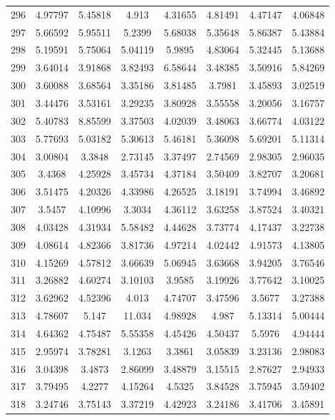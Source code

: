 \begin{center}
\begin{longtable}{cccccccc}
296 & 4.97797 & 5.45818 & 4.913 & 4.31655 & 4.81491 & 4.47147 & 4.06848\\
297 & 5.66592 & 5.95511 & 5.2399 & 5.68038 & 5.35648 & 5.86387 & 5.43884\\
298 & 5.19591 & 5.75064 & 5.04119 & 5.9895 & 4.83064 & 5.32445 & 5.13688\\
299 & 3.64014 & 3.91868 & 3.82493 & 6.58644 & 3.48385 & 3.50916 & 5.84269\\
300 & 3.60088 & 3.68564 & 3.35186 & 3.81485 & 3.7981 & 3.45893 & 3.02519\\
301 & 3.44476 & 3.53161 & 3.29235 & 3.80928 & 3.55558 & 3.20056 & 3.16757\\
302 & 5.40783 & 8.85599 & 3.37503 & 4.02039 & 3.48063 & 3.66774 & 4.03122\\
303 & 5.77693 & 5.03182 & 5.30613 & 5.46181 & 5.36098 & 5.69201 & 5.11314\\
304 & 3.00804 & 3.3848 & 2.73145 & 3.37497 & 2.74569 & 2.98305 & 2.96035\\
305 & 3.4368 & 4.25928 & 3.45734 & 4.37184 & 3.50409 & 3.82707 & 3.20681\\
306 & 3.51475 & 4.20326 & 4.33986 & 4.26525 & 3.18191 & 3.74994 & 3.46892\\
307 & 3.5457 & 4.10996 & 3.3034 & 4.36112 & 3.63258 & 3.87524 & 3.40321\\
308 & 4.03428 & 4.31934 & 5.58482 & 4.44628 & 3.73774 & 4.17437 & 3.22738\\
309 & 4.08614 & 4.82366 & 3.81736 & 4.97214 & 4.02442 & 4.91573 & 4.13805\\
310 & 4.15269 & 4.57812 & 3.66639 & 5.06945 & 3.63668 & 3.94205 & 3.76546\\
311 & 3.26882 & 4.60274 & 3.10103 & 3.9585 & 3.19926 & 3.77642 & 3.10025\\
312 & 3.62962 & 4.52396 & 4.013 & 4.74707 & 3.47596 & 3.5677 & 3.27388\\
313 & 4.78607 & 5.147 & 11.034 & 4.98928 & 4.987 & 5.13314 & 5.00444\\
314 & 4.64362 & 4.75487 & 5.55358 & 4.45426 & 4.50437 & 5.5976 & 4.94444\\
315 & 2.95974 & 3.78281 & 3.1263 & 3.3861 & 3.05839 & 3.23136 & 2.98083\\
316 & 3.04398 & 3.4873 & 2.86099 & 3.48879 & 3.15515 & 2.87627 & 2.94933\\
317 & 3.79495 & 4.2277 & 4.15264 & 4.5325 & 3.84528 & 3.75945 & 3.59402\\
318 & 3.24746 & 3.75143 & 3.37219 & 4.42923 & 3.24186 & 3.41706 & 3.45891\\

\end{longtable}
\end{center}
